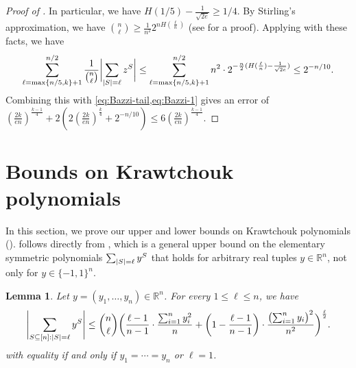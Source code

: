 \documentclass[10pt,a4paper]{article}
\newtheorem{lemma}[theorem]{Lemma}
\theoremstyle{definition}
\newcommand{\R}{\mathbb R}
\newcommand{\pmo}{\{-1,1\}}
\DeclarePairedDelimiter\abs{\lvert}{\rvert}
\begin{document}
\begin{proof}[Proof of ]
  In particular, we have $H(1/5) - \frac{1}{\sqrt{2e}} \ge 1/4$.
  By Stirling's approximation, we have $\binom{n}{\ell} \ge \frac{1}{n^2} 2^{n H(\frac{\ell}{n})}$ (see \cite{CT06} for a proof).
  Applying  with these facts, we have
  \begin{align*}
    \sum_{\ell=\max\{n/5,k\}+1}^{n/2} \frac{1}{\binom{n}{\ell}} \abs[\bigg]{\sum_{\abs{S}=\ell} z^S}
    \le \sum_{\ell=\max\{n/5,k\}+1}^{n/2} n^2 \cdot 2^{-\frac{n}{2}(H(\frac{\ell}{n}) - \frac{1}{\sqrt{2e}})}
    \le 2^{-n/10} .
  \end{align*}
  Combining this with \cref{eq:Bazzi-tail,eq:Bazzi-1} gives an error of $(\frac{2k}{en})^{\frac{k-1}{4}} + 2(2(\frac{2k}{en})^{\frac{k}{4}} + 2^{-n/10}) \le 6 (\frac{2k}{en})^{\frac{k-1}{4}}$. \qedhere
\end{proof}

\section{Bounds on Krawtchouk polynomials} \label{sec:Kraw-bounds}

In this section, we prove our upper and lower bounds on Krawtchouk polynomials ().   follows directly from , which is a general upper bound on the elementary symmetric polynomials $\sum_{\abs{S}=\ell} y^S$ that holds for arbitrary real tuples $y \in \R^n$, not only for $y \in \pmo^n$.

\begin{lemma} \label{lemma:elem-sym-ineq}
  Let $y = (y_1, \ldots, y_n) \in \R^n$.
  For every $1 \le \ell \le n$, we have
  \[
  \abs[\Bigg]{ \sum_{S \subseteq [n]: \abs{S}=\ell} y^S }
    \le \binom{n}{\ell}  \biggl( \frac{\ell-1}{n-1} \cdot \frac{\sum_{i=1}^n y_i^2}{n} + \left(1 - \frac{\ell-1}{n-1} \right) \cdot \frac{\bigl(\sum_{i=1}^n y_i\bigr)^2}{n^2} \biggr)^{\frac{\ell}{2}} .
  \]
  with equality if and only if $y_1 = \cdots = y_n$ or $\ell=1$.
\end{lemma}
\end{document}
